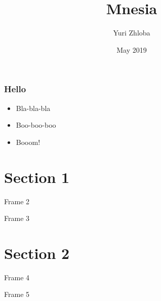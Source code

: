 \documentclass{beamer}
\title[Mnesia]{Mnesia}
\author{Yuri Zhloba}
\institute{Wargaming.net}
\date{May 2019}
\begin{document}
\maketitle

\begin{frame}
  \frametitle{Hello}
  \begin{itemize}[<+->]
    \item Bla-bla-bla
    \item Boo-boo-boo
    \item Booom!
  \end{itemize}
\end{frame}

\section{Section 1}

\begin{frame}
Frame 2
\end{frame}

\begin{frame}
Frame 3
\end{frame}

\section{Section 2}

\begin{frame}
Frame 4
\end{frame}

\begin{frame}
Frame 5
\end{frame}
\end{document}
